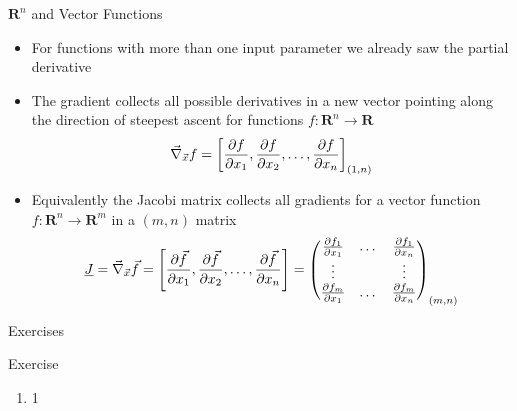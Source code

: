   \begin{frame}{$\mathbf{R}^n$ and Vector Functions}
    \begin{itemize}
      \item For functions with more than one input parameter we already saw the partial derivative
      \item The gradient collects all possible derivatives in a new vector pointing along the direction of steepest ascent for functions $f:\mathbf{R}^n\rightarrow \mathbf{R}$
      \begin{equation*}
        \vec{\nabla}_{\vec{x}} f = \left[
          \frac{\partial f}{\partial x_1}, \frac{\partial f}{\partial x_2}, \dots, \frac{\partial f}{\partial x_n} \right]_{(1, n)}
      \end{equation*}
      \item Equivalently the Jacobi matrix collects all gradients for a vector function $f:\mathbf{R}^n\rightarrow\mathbf{R}^m$ in a $(m, n)$ matrix
      \begin{equation*}
        \underline{J} = \vec{\nabla}_{\vec{x}} \vec{f} = \left[
          \frac{\partial \vec{f}}{\partial x_1}, \frac{\partial \vec{f}}{\partial x_2}, \dots, \frac{\partial \vec{f}}{\partial x_n} \right] =
          \begin{pmatrix}
            \frac{\partial f_1}{\partial x_1} & \dots & \frac{\partial f_1}{\partial x_n} \\
            \vdots & & \vdots \\
            \frac{\partial f_m}{\partial x_1} & \dots & \frac{\partial f_m}{\partial x_n}
          \end{pmatrix}_{(m, n)}
      \end{equation*}
    \end{itemize}
  \end{frame}

  \begin{frame}{Exercises}
    \begin{exampleblock}{Exercise}
      \begin{enumerate}
        \item 1
      \end{enumerate}
    \end{exampleblock}
  \end{frame}

